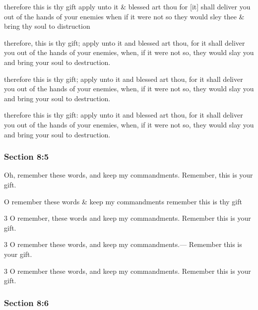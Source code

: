 		\begin{framed}
		\scriptsize
			\begin{compactdesc}
				\item[JSP] therefore this is thy gift apply unto it \& blessed art thou for [it] shall deliver you out of the hands of your enemies when if it were not so they would sley thee \& bring thy soul to distruction
				\item[BC] therefore, this is thy gift; apply unto it and blessed art thou, for it shall deliver you out of the hands of your enemies, when, if it were not so, they would slay you and bring your soul to destruction.
				\item[DC 1835] therefore this is thy gift; apply unto it and blessed art thou, for it shall deliver you out of the hands of your enemies, when, if it were not so, they would slay you and bring your soul to destruction.
				\item[DC 1844] therefore this is thy gift: apply unto it and blessed art thou, for it shall deliver you out of the hands of your enemies, when, if it were not so, they would slay you and bring your soul to destruction.
			\end{compactdesc}
		\end{framed}

	\subsubsection{Section 8:5} %
		\label{DC8-5}

		Oh, remember these words, and keep my commandments.  Remember, this is your gift.

		\begin{framed}
		\scriptsize
			\begin{compactdesc}
				\item[JSP] O remember these words \& keep my commandments remember this is thy gift
				\item[BC] 3 O remember, these words and keep my commandments. Remember this is your gift.
				\item[DC 1835] 3 O remember these words, and keep my commandments.--- Remember this is your gift.
				\item[DC 1844] 3 O remember these words, and keep my commandments. Remember this is your gift. 
			\end{compactdesc}
		\end{framed}

	\subsubsection{Section 8:6} %
		\label{DC8-6}

